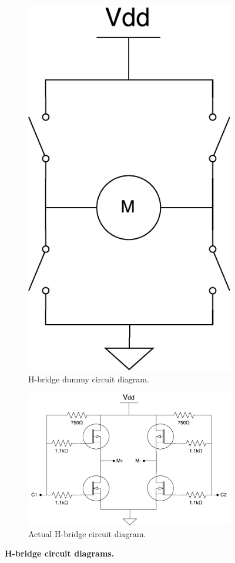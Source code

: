 \documentclass[letterpaper, 11pt]{article}
\begin{document}
\begin{figure}[ht]
    \centering
    \begin{subfigure}[t]{0.33\textwidth}
        \centering
        \includegraphics[height=0.3\textheight]{images/hbridge.pdf}
        \caption{H-bridge dummy circuit diagram.}
        \label{fig:hb-dummy}
    \end{subfigure}\hfill
    \begin{subfigure}[t]{0.66\textwidth}
        \includegraphics[height=0.3\textheight]{images/hbridge-circuit.pdf}
        \caption{Actual H-bridge circuit diagram.}
        \label{fig:hb-circuit}
    \end{subfigure}
    \caption{\textbf{H-bridge circuit diagrams.}}
    \label{fig:hbridge}
\end{figure}
\end{document}
